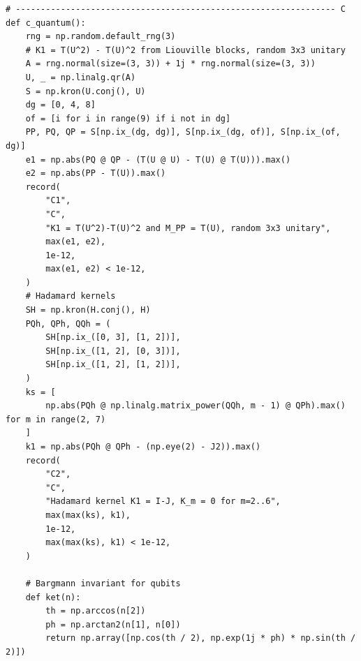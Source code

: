 \documentclass[11pt,oneside]{book}
\theoremstyle{definition}
\theoremstyle{remark}
\begin{document}
{\begin{verbatim}
# ---------------------------------------------------------------- C
def c_quantum():
    rng = np.random.default_rng(3)
    # K1 = T(U^2) - T(U)^2 from Liouville blocks, random 3x3 unitary
    A = rng.normal(size=(3, 3)) + 1j * rng.normal(size=(3, 3))
    U, _ = np.linalg.qr(A)
    S = np.kron(U.conj(), U)
    dg = [0, 4, 8]
    of = [i for i in range(9) if i not in dg]
    PP, PQ, QP = S[np.ix_(dg, dg)], S[np.ix_(dg, of)], S[np.ix_(of, dg)]
    e1 = np.abs(PQ @ QP - (T(U @ U) - T(U) @ T(U))).max()
    e2 = np.abs(PP - T(U)).max()
    record(
        "C1",
        "C",
        "K1 = T(U^2)-T(U)^2 and M_PP = T(U), random 3x3 unitary",
        max(e1, e2),
        1e-12,
        max(e1, e2) < 1e-12,
    )
    # Hadamard kernels
    SH = np.kron(H.conj(), H)
    PQh, QPh, QQh = (
        SH[np.ix_([0, 3], [1, 2])],
        SH[np.ix_([1, 2], [0, 3])],
        SH[np.ix_([1, 2], [1, 2])],
    )
    ks = [
        np.abs(PQh @ np.linalg.matrix_power(QQh, m - 1) @ QPh).max() for m in range(2, 7)
    ]
    k1 = np.abs(PQh @ QPh - (np.eye(2) - J2)).max()
    record(
        "C2",
        "C",
        "Hadamard kernel K1 = I-J, K_m = 0 for m=2..6",
        max(max(ks), k1),
        1e-12,
        max(max(ks), k1) < 1e-12,
    )

    # Bargmann invariant for qubits
    def ket(n):
        th = np.arccos(n[2])
        ph = np.arctan2(n[1], n[0])
        return np.array([np.cos(th / 2), np.exp(1j * ph) * np.sin(th / 2)])


\end{verbatim}}
\end{document}
